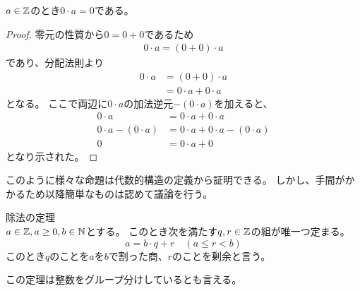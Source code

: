 \documentclass[uplatex, 11pt, a4j, dvipdfmx]{jsarticle}
\begin{document}
    \begin{screen}
      \begin{prop}
        $a \in \mathbb{Z}$のとき$0 \cdot a = 0$である。
      \end{prop}
      \begin{proof}
        零元の性質から$0 = 0 + 0$であるため
        \begin{equation} \begin{aligned}
          0 \cdot a = (0 + 0) \cdot a
        \end{aligned} \end{equation}
        であり、分配法則より
        \begin{equation} \begin{aligned}
          0 \cdot a &= (0 + 0) \cdot a \\
                    &= 0 \cdot a + 0 \cdot a
        \end{aligned} \end{equation}
        となる。
        ここで両辺に$0 \cdot a$の加法逆元$-(0 \cdot a)$を加えると、
        \begin{equation} \begin{aligned}
          0 \cdot a               &= 0 \cdot a + 0 \cdot a \\
          0 \cdot a - (0 \cdot a) &= 0 \cdot a + 0 \cdot a  - (0 \cdot a) \\
          0                       &= 0 \cdot a + 0
        \end{aligned} \end{equation}
        となり示された。
      \end{proof}
    \end{screen}

    このように様々な命題は代数的構造の定義から証明できる。
    しかし、手間がかかるため以降簡単なものは認めて議論を行う。

    \begin{screen}
      \begin{thm}
        \label{thm:division-theorem}
        除法の定理\\
        $a \in \mathbb{Z}, a \geq 0, b \in \mathbb{N}$とする。
        このとき次を満たす$q, r \in \mathbb{Z}$の組が唯一つ定まる。
        \begin{equation}
          a = b \cdot q + r \quad (a \leq r < b)
        \end{equation}
        このとき$q$のことを$a$を$b$で割った商、$r$のことを剰余と言う。

        この定理は整数をグループ分けしているとも言える。
      \end{thm}
    \end{screen}
\end{document}
